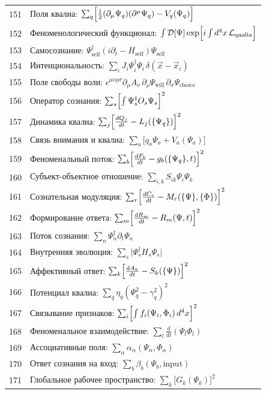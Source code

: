 \documentclass[12pt,a4paper]{article}
\begin{document}
\begin{longtable}{r l}
		151 & Поля квалиа: $\sum_q\Bigl[\frac12(\partial_\mu\Psi_q)(\partial^\mu\Psi_q) - V_q(\Psi_q)\Bigr]$ \\
		152 & Феноменологический функционал: $\int\mathcal{D}[\Psi]\exp\Bigl[i\int d^4x\,\mathcal{L}_{\text{qualia}}\Bigr]$ \\
		153 & Самосознание: $\Psi^\dagger_{\text{self}}(i\partial_t - H_{\text{self}})\Psi_{\text{self}}$ \\
		154 & Интенциональность: $\sum_i J_i\Psi^\dagger_i\Psi_i\,\delta(\vec x - \vec x_i)$ \\
		155 & Поле свободы воли: $\epsilon^{\mu\nu\rho\sigma}\partial_\mu A_\nu\,\partial_\rho\Psi_{\text{will}}\,\partial_\sigma\Psi_{\text{choice}}$ \\
		156 & Оператор сознания: $\sum_s\Bigl[\int\Psi^\dagger_s O_s\Psi_s\Bigr]^2$ \\
		157 & Динамика квалиа: $\sum_j\Bigl[\frac{dQ_j}{dt} - L_j(\{\Psi_q\})\Bigr]^2$ \\
		158 & Связь внимания и квалиа: $\sum_a\bigl[q_a\Psi_a + V_a(\Psi_a)\bigr]$ \\
		159 & Феноменальный поток: $\sum_b\Bigl[\frac{dF_b}{dt} - g_b(\{\Psi_q\},t)\Bigr]^2$ \\
		160 & Субъект-объектное отношение: $\sum_{i,k}S_{ik}\Psi_i\Psi_k$ \\
		161 & Сознательная модуляция: $\sum_r\Bigl[\frac{dC_r}{dt} - M_r(\{\Psi\},\{\Phi\})\Bigr]^2$ \\
		162 & Формирование ответа: $\sum_m\Bigl[\frac{dR_m}{dt} - R_m(\Psi,t)\Bigr]^2$ \\
		163 & Поток сознания: $\sum_n\Psi^\dagger_n\partial_t\Psi_n$ \\
		164 & Внутренняя эволюция: $\sum_s\bigl|\Psi^\dagger_s H_s\Psi_s\bigr|$ \\
		165 & Аффективный ответ: $\sum_k\Bigl[\frac{dA_k}{dt} - S_k(\{\Psi\})\Bigr]^2$ \\
		166 & Потенциал квалиа: $\sum_q\eta_q(\Psi_q^2 - \gamma_q^2)^2$ \\
		167 & Связывание признаков: $\sum_i\Bigl[\int f_i(\Psi_i,\Phi_i)\,d^4x\Bigr]^2$ \\
		168 & Феноменальное взаимодействие: $\sum_l\frac{d}{dt}(\Psi_l\Phi_l)$ \\
		169 & Ассоциативные поля: $\sum_\alpha\alpha_\alpha(\Psi_\alpha,\Phi_\alpha)$ \\
		170 & Ответ сознания на вход: $\sum_b\beta_b(\Psi_b,\text{input})$ \\
		171 & Глобальное рабочее пространство: $\sum_k\bigl[G_k(\Psi_k)\bigr]^2$ \\

\end{longtable}
\end{document}
